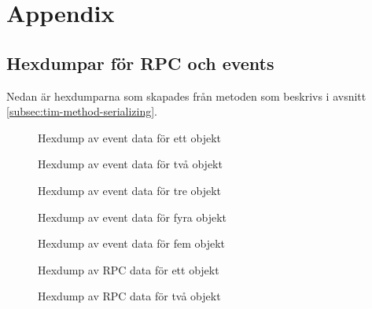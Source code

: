 \section{Appendix}
\label{sec:tim-appendix}

\subsection{Hexdumpar för RPC och events}
\label{subsec:tim-hexdumps}
Nedan är hexdumparna som skapades från metoden som beskrivs i avsnitt \ref{subsec:tim-method-serializing}.

\begin{figure}
    \scriptsize
    \center
    
    \caption{Hexdump av event data för ett objekt}
    \label{fig:tim-eventdata1}
\end{figure}

\begin{figure}
    \scriptsize
    \center
    
    \caption{Hexdump av event data för två objekt}
    \label{fig:tim-eventdata2}
\end{figure}

\begin{figure}
    \scriptsize
    \center
    
    \caption{Hexdump av event data för tre objekt}
    \label{fig:tim-eventdata3}
\end{figure}

\begin{figure}
    \scriptsize
    \center
    
    \caption{Hexdump av event data för fyra objekt}
    \label{fig:tim-eventdata4}
\end{figure}

\begin{figure}
    \scriptsize
    \center
    
    \caption{Hexdump av event data för fem objekt}
    \label{fig:tim-eventdata5}
\end{figure}

\begin{figure}
    \scriptsize
    \center
    
    \caption{Hexdump av RPC data för ett objekt}
    \label{fig:tim-rpcdata1}
\end{figure}

\begin{figure}
    \scriptsize
    \center
    
    \caption{Hexdump av RPC data för två objekt}
    \label{fig:tim-rpcdata2}
\end{figure}

